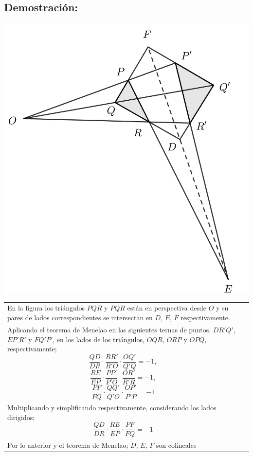 \documentclass[12pt,a4paper]{article}
\begin{document}
\subsection*{Demostración:}
\begin{center}
\includegraphics[scale=0.5]{desargue.png} 
\end{center}
\begin{tabular}{p{15.9 cm} p{1cm}}
En la figura los triángulos $PQR$ y $PQR$ están en perspectiva desde $O$ y su pares de lados correspondientes se intersectan en $D$, $E$, $F$ respectivamente.\\Aplicando el teorema de Menelao en las siguientes ternas de puntos, $DR'Q'$, $EP'R'$ y $FQ'P'$, en los lados de los triángulos, $OQR$, $ORP$ y $OPQ$, respectivamente; 
$$\dfrac{QD}{DR}\cdot\dfrac{RR'}{R'O}\cdot\dfrac{OQ'}{Q'Q}=-1,$$ 
$$\dfrac{RE}{EP}\cdot\dfrac{PP'}{P'O}\cdot \dfrac{OR'}{R'R}=-1,$$ $$\dfrac{PF}{FQ}\cdot\dfrac{QQ'}{Q'O}\cdot\dfrac{OP'}{P'P}=-1$$
\\Multiplicando y simplificando respectivamente, considerando los lados dirigidos; $$\dfrac{QD}{DR}\cdot \dfrac{RE}{EP}\cdot \dfrac{PF}{FQ}=-1$$ 
\\Por lo anterior y el teorema de Menelao; $D$, $E$, $F$ son colineales
\end{tabular}
\end{document}
